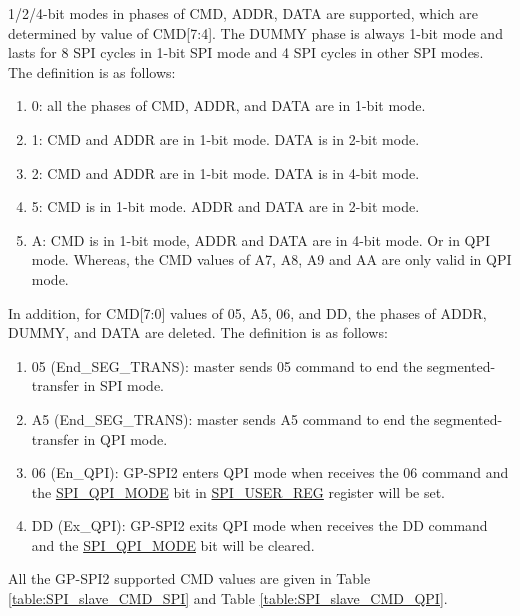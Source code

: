 \documentclass[main\_\_EN.tex]{subfiles}
\begin{document}
1/2/4-bit modes in phases of CMD, ADDR, DATA are supported, which are determined by value of CMD[7:4]. The DUMMY phase is always 1-bit mode and lasts for 8 SPI cycles in 1-bit SPI mode and 4 SPI cycles in other SPI modes. The definition is as follows:

\begin{enumerate}
    \item \hexprefix{}0: all the phases of CMD, ADDR, and DATA are in 1-bit mode.
    \item \hexprefix{}1: CMD and ADDR are in 1-bit mode. DATA is in 2-bit mode.
    \item \hexprefix{}2: CMD and ADDR are in 1-bit mode. DATA is in 4-bit mode.
    \item \hexprefix{}5: CMD is in 1-bit mode. ADDR and DATA are in 2-bit mode.
    \item \hexprefix{}A: CMD is in 1-bit mode, ADDR and DATA are in 4-bit mode. Or in QPI mode. Whereas, the CMD values of \hexprefix{}A7, \hexprefix{}A8, \hexprefix{}A9 and \hexprefix{}AA are only valid in QPI mode.
\end{enumerate}

In addition, for CMD[7:0] values of \hexprefix{}05, \hexprefix{}A5, \hexprefix{}06, and \hexprefix{}DD, the phases of ADDR, DUMMY, and DATA are deleted. The definition is as follows:

\begin{enumerate}
    \item \hexprefix{}05 (End\_SEG\_TRANS): master sends \hexprefix{}05 command to end the segmented-transfer in SPI mode.
    \item \hexprefix{}A5 (End\_SEG\_TRANS): master sends \hexprefix{}A5 command to end the segmented-transfer in QPI mode.
    \item \hexprefix{}06 (En\_QPI): GP-SPI2 enters QPI mode when receives the \hexprefix{}06 command and the \hyperref[fielddesc:SPIQPIMODE]{SPI\_QPI\_MODE} bit in \hyperref[regdesc:SPIUSERREG]{SPI\_USER\_REG} register will be set.
    \item \hexprefix{}DD (Ex\_QPI): GP-SPI2 exits QPI mode when receives the \hexprefix{}DD command and the \hyperref[fielddesc:SPIQPIMODE]{SPI\_QPI\_MODE} bit will be cleared.
\end{enumerate}


All the GP-SPI2 supported CMD values are given in Table \ref{table:SPI_slave_CMD_SPI} and Table \ref{table:SPI_slave_CMD_QPI}.
\end{document}
